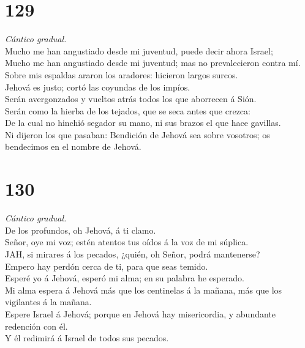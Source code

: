 \hypertarget{section-128}{%
\section{129}\label{section-128}}

 \emph{Cántico gradual.}\\
Mucho me han angustiado desde mi juventud, puede decir ahora Israel;\\
 Mucho me han angustiado desde mi juventud; mas no
prevalecieron contra mí.\\
 Sobre mis espaldas araron los aradores: hicieron largos
surcos.\\
 Jehová es justo; cortó las coyundas de los impíos.\\
 Serán avergonzados y vueltos atrás todos los que aborrecen
á Sión.\\
 Serán como la hierba de los tejados, que se seca antes que
crezca:\\
 De la cual no hinchió segador su mano, ni sus brazos el que
hace gavillas.\\
 Ni dijeron los que pasaban: Bendición de Jehová sea sobre
vosotros; os bendecimos en el nombre de Jehová.

\hypertarget{section-129}{%
\section{130}\label{section-129}}

 \emph{Cántico gradual.}\\
De los profundos, oh Jehová, á ti clamo.\\
 Señor, oye mi voz; estén atentos tus oídos á la voz de mi
súplica.\\
 JAH, si mirares á los pecados, ¿quién, oh Señor, podrá
mantenerse?\\
 Empero hay perdón cerca de ti, para que seas temido.\\
 Esperé yo á Jehová, esperó mi alma; en su palabra he
esperado.\\
 Mi alma espera á Jehová más que los centinelas á la mañana,
más que los vigilantes á la mañana.\\
 Espere Israel á Jehová; porque en Jehová hay misericordia,
y abundante redención con él.\\
 Y él redimirá á Israel de todos sus pecados.

